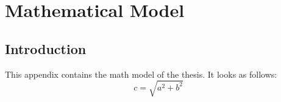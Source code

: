 \chapter{Mathematical Model}\label{app:math_model_main_rotor}%
    \section{Introduction}%
        This appendix contains the math model of the thesis. It looks as follows:
        \begin{equation}
            c = \sqrt{a^2+b^2}
        \end{equation}
        
        
        
        
        
        
